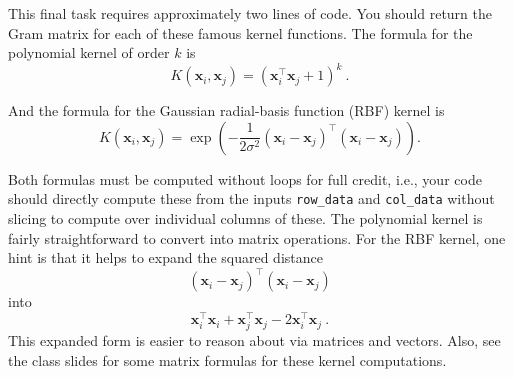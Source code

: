 \documentclass[10pt]{article}
\newcommand{\bx}{{\boldsymbol x}}
\begin{document}
\begin{enumerate}
This final task requires approximately two lines of code. You should return the Gram matrix for each of these famous kernel functions. The formula for the polynomial kernel of order $k$ is
\begin{equation}
K(\bx_i, \bx_j) = (\bx_i^\top \bx_j + 1)^k~.
\end{equation}

And the formula for the Gaussian radial-basis function (RBF) kernel is
\begin{equation}
K(\bx_i, \bx_j) = \exp\left(- \frac{1}{2 \sigma^2} (\bx_i - \bx_j) ^\top (\bx_i - \bx_j)\right).
\end{equation}

Both formulas must be computed without loops for full credit, i.e., your code should directly compute these from the inputs \texttt{row\_data} and \texttt{col\_data} without slicing to compute over individual columns of these. The polynomial kernel is fairly straightforward to convert into matrix operations. For the RBF kernel, one hint is that it helps to expand the squared distance 
\[
(\bx_i - \bx_j) ^\top (\bx_i - \bx_j)
\]
into
\[
\bx_i^\top \bx_i + \bx_j^\top \bx_j - 2 \bx_i^\top \bx_j~.
\]
This expanded form is easier to reason about via matrices and vectors. Also, see the class slides for some matrix formulas for these kernel computations.

\end{enumerate}
\end{document}
